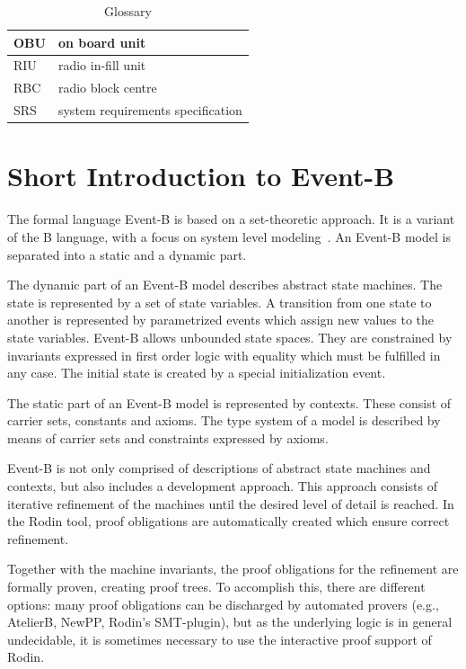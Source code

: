 \documentclass{template/openetcs_article}
\begin{document}
\begin{table}[ht]
  \centering
  \begin{tabular}[ht]{|l|l|}
    \hline
    OBU & on board unit \\
    \hline
    RIU & radio in-fill unit \\
    \hline
    RBC & radio block centre \\
    \hline
    SRS & system requirements specification \\
    \hline
  \end{tabular}
  \caption{Glossary}
  \label{tab:glossary}
\end{table}

\section{Short Introduction to Event-B}
\label{sec:short-intr-event}

The formal language Event-B is based on a set-theoretic approach. It is a
variant of the B language, with a focus on system level
modeling~\cite{abrial-eventB-Book}. An Event-B model is separated into a static
and a dynamic part.

The dynamic part of an Event-B model describes abstract state machines. The
state is represented by a set of state variables. A transition from one state to
another is represented by parametrized events which assign new values to the
state variables. Event-B allows unbounded state spaces. They are constrained by
invariants expressed in first order logic with equality which must be fulfilled
in any case. The initial state is created by a special initialization event.

The static part of an Event-B model is represented by contexts. These consist of
carrier sets, constants and axioms. The type system of a model is described by
means of carrier sets and constraints expressed by axioms.

Event-B is not only comprised of descriptions of abstract state machines and
contexts, but also includes a development approach. This approach consists of
iterative refinement of the machines until the desired level of detail is
reached. In the Rodin tool, proof obligations are automatically created which
ensure correct refinement.

Together with the machine invariants, the proof obligations for the refinement
are formally proven, creating proof trees. To accomplish this, there are
different options: many proof obligations can be discharged by automated provers
(e.g., AtelierB, NewPP, Rodin's SMT-plugin), but as the underlying logic is in
general undecidable, it is sometimes necessary to use the interactive proof
support of Rodin.
\end{document}
